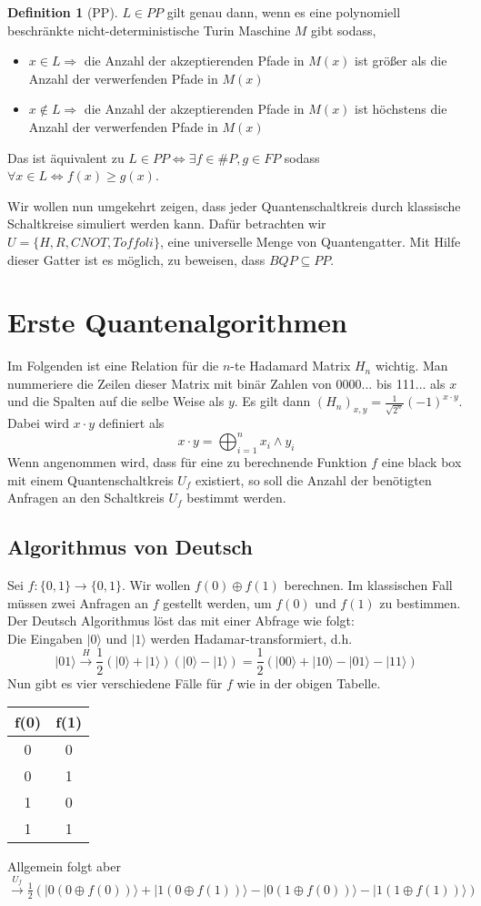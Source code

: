 \documentclass[a4paper, 12pt]{article}
\theoremstyle{plain}
\theoremstyle{definition}
\newtheorem{definition}[theorem]{Definition} %
\theoremstyle{lemma}
\theoremstyle{remark}
\theoremstyle{example}
\begin{document}
	\begin{definition}[PP]
		$L \in PP$ gilt genau dann, wenn es eine polynomiell beschränkte nicht-deterministische Turin Maschine $M$ gibt sodass, \begin{itemize}
			\item $x \in L \Rightarrow$ die Anzahl der akzeptierenden Pfade in $M(x)$ ist größer als die Anzahl der verwerfenden Pfade in $M(x)$
			\item $x \notin L \Rightarrow$ die Anzahl der akzeptierenden Pfade in $M(x)$ ist höchstens die Anzahl der verwerfenden Pfade in $M(x)$
		\end{itemize}
		Das ist äquivalent zu $L \in PP \Leftrightarrow \exists f \in \#P, g \in FP$ sodass $\forall x \in L \Leftrightarrow f(x) \geq g(x)$.
	\end{definition}
	Wir wollen nun umgekehrt zeigen, dass jeder Quantenschaltkreis durch klassische Schaltkreise simuliert werden kann. Dafür betrachten wir $U = \{H, R, CNOT, Toffoli\}$, eine universelle Menge von Quantengatter. Mit Hilfe dieser Gatter ist es möglich, zu beweisen, dass $BQP \subseteq PP$.
	\section{Erste Quantenalgorithmen}
	Im Folgenden ist eine Relation für die $n$-te Hadamard Matrix $H_n$ wichtig. Man nummeriere die Zeilen dieser Matrix mit binär Zahlen von 0000... bis 111... als $x$ und die Spalten auf die selbe Weise als $y$. Es gilt dann $(H_n)_{x,y} = \frac{1}{\sqrt{2^n}}(-1)^{x\cdot y}$. Dabei wird $x\cdot y$ definiert als \[x\cdot y = \bigoplus_{i=1}^n x_i \land y_i\] 
	Wenn angenommen wird, dass für eine zu berechnende Funktion $f$ eine black box mit einem Quantenschaltkreis $U_f$ existiert, so soll die Anzahl der benötigten Anfragen an den Schaltkreis $U_f$ bestimmt werden.
	\subsection{Algorithmus von Deutsch}
	Sei $f:\{0,1\} \to \{0,1\}$. Wir wollen $f(0)\oplus f(1)$ berechnen. Im klassischen Fall müssen zwei Anfragen an $f$ gestellt werden, um $f(0)$ und $f(1)$ zu bestimmen. Der Deutsch Algorithmus löst das mit einer Abfrage wie folgt:\\
	Die Eingaben $|0\rangle$ und $|1\rangle$ werden Hadamar-transformiert, d.h. \[|01\rangle \overset{H}{\to} \frac{1}{2}(|0\rangle+|1\rangle)(|0\rangle - |1\rangle) = \frac{1}{2}(|00\rangle + |10\rangle - |01\rangle - |11\rangle)\] Nun gibt es vier verschiedene Fälle für $f$ wie in der obigen Tabelle. \begin{table}
		\centering
		\begin{tabular}{c|c}
			f(0) & f(1) \\
			\hline
			0 & 0\\
			0 & 1\\
			1 & 0\\
			1 & 1
		\end{tabular}
	\end{table}
	Allgemein folgt aber $\overset{U_f}{\to} \frac{1}{2}(|0(0\oplus f(0))\rangle + |1(0\oplus f(1))\rangle - |0(1\oplus f(0))\rangle - |1(1\oplus f(1))\rangle)$
\end{document}
